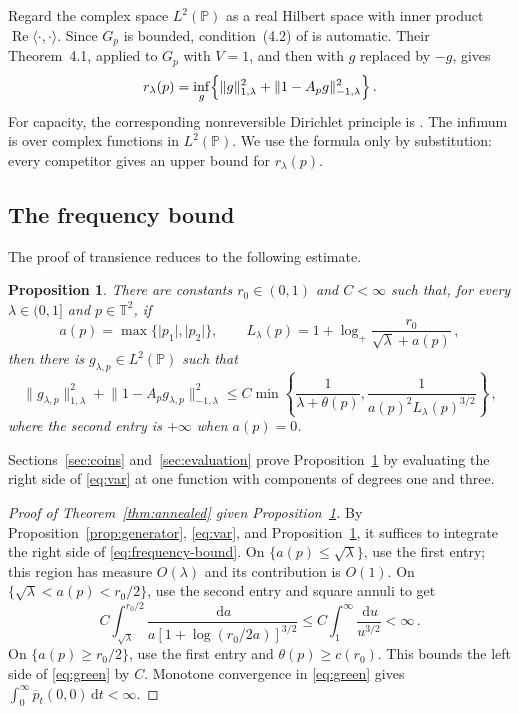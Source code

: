 \documentclass[11pt]{amsart}
\theoremstyle{plain}
\newtheorem{proposition}[theorem]{Proposition}
\theoremstyle{definition}
\newcommand{\T}{\mathbb T}
\renewcommand{\P}{\mathbb P}
\newcommand{\1}{\mathbf 1}
\newcommand{\ip}[2]{\langle #1,#2\rangle}
\newcommand{\norm}[1]{\lVert #1\rVert}
\newcommand{\abs}[1]{\lvert #1\rvert}
\newcommand{\dd}{\,\mathrm d}
\newcommand{\Hminus}[1]{\norm{#1}_{-1,\lambda}}
\newcommand{\Hplus}[1]{\norm{#1}_{1,\lambda}}
\begin{document}
Regard the complex space $L^2(\P)$ as a real Hilbert space with inner product
$\operatorname{Re}\ip\cdot\cdot$.  Since $G_p$ is bounded, condition~(4.2)
of \citet*{KLO12} is automatic.  Their Theorem~4.1, applied to $G_p$ with
$V=1$, and then with $g$ replaced by $-g$, gives
\begin{equation}
  r_\lambda(p)
  =\inf_g\Bigl\{\Hplus g^2+\Hminus{1-A_pg}^2\Bigr\}\, .
  \label{eq:var}
\end{equation}
For capacity, the corresponding nonreversible Dirichlet principle is
\citet*[Theorem~2.4 and (2.9)--(2.10)]{GL14}.
The infimum is over complex functions in $L^2(\P)$.  We use the formula only
by substitution: every competitor gives an upper bound for $r_\lambda(p)$.

\subsection{The frequency bound}\label{ssec:frequency}

The proof of transience reduces to the following estimate.

\begin{proposition}\label{prop:frequency}
There are constants $r_0\in(0,1)$ and $C<\infty$ such that, for every
$\lambda\in(0,1]$ and $p\in\T^2$, if
\[
  a(p)=\max\{\abs{p_1},\abs{p_2}\},
  \qquad L_\lambda(p)=1+\log_+\frac{r_0}{\sqrt\lambda+a(p)}\, ,
\]
then there is $g_{\lambda,p}\in L^2(\P)$ such that
\begin{equation}\label{eq:frequency-bound}
  \Hplus{g_{\lambda,p}}^2+
  \Hminus{1-A_pg_{\lambda,p}}^2
  \leq C\min\left\{
  \frac1{\lambda+\theta(p)},
  \frac1{a(p)^2L_\lambda(p)^{3/2}}
  \right\}\, ,
\end{equation}
where the second entry is $+\infty$ when $a(p)=0$.
\end{proposition}

Sections~\ref{sec:coins} and~\ref{sec:evaluation} prove
Proposition~\ref{prop:frequency} by evaluating the right side of
\eqref{eq:var} at one function with components of degrees one and
three.

\begin{proof}[Proof of Theorem~\ref{thm:annealed} given Proposition~\ref{prop:frequency}]
By Proposition~\ref{prop:generator}, \eqref{eq:var}, and
Proposition~\ref{prop:frequency}, it suffices to integrate the right side of
\eqref{eq:frequency-bound}.  On $\{a(p)\leq\sqrt\lambda\}$, use the first entry;
this region has measure $O(\lambda)$ and its contribution is $O(1)$.  On
$\{\sqrt\lambda<a(p)<r_0/2\}$, use the second entry and square annuli to get
\[
  C\int_{\sqrt\lambda}^{r_0/2}
  \frac{\dd a}{a[1+\log(r_0/2a)]^{3/2}}
  \leq C\int_1^\infty\frac{\dd u}{u^{3/2}}<\infty\, .
\]
On $\{a(p)\geq r_0/2\}$, use the first entry and
$\theta(p)\geq c(r_0)$.  This bounds the left side of \eqref{eq:green} by $C$.  Monotone
convergence in \eqref{eq:green} gives
$\int_0^\infty\overline p_t(0,0)\dd t<\infty$.
\end{proof}
\end{document}
